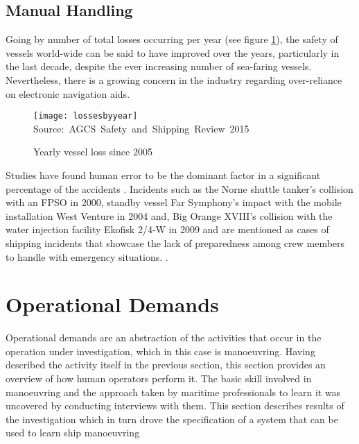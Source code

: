 
\subsection{Manual Handling}
Going by number of total losses occurring per year (see figure \ref{fig:lossesbyyear}), the safety of vessels world-wide can be said to have improved over the years, particularly in the last decade, despite the ever increasing number of sea-faring vessels. Nevertheless, there is a growing concern in the industry regarding over-reliance on electronic navigation aids. 

\begin{figure}
	\centering
	\caption{Yearly vessel loss since 2005}
	\texttt{[image: lossesbyyear]}
	\hbox{Source: AGCS Safety and Shipping Review 2015}
	\label{fig:lossesbyyear}
\end{figure}

Studies have found human error to be the dominant factor in a significant percentage of the accidents \parencite{baker2005accident, hauff2014analysis}. Incidents such as the Norne shuttle tanker's collision with an FPSO in 2000, standby vessel Far Symphony's impact with the mobile installation West Venture in 2004 and, Big Orange XVIII's collision with the water injection facility Ekofisk 2/4-W in 2009 and  are mentioned as cases of shipping incidents that showcase the lack of preparedness among crew members to handle with emergency situations. \parencite{vinnem2013offshore}.

\section{Operational Demands}
\label{sec:operationaldemands}

Operational demands are an abstraction of the activities that occur in the operation under investigation, which in this case is manoeuvring. Having described the activity itself in the previous section, this section provides an overview of how human operators perform it. The basic skill involved in manoeuvring and the approach taken by maritime professionals to learn it was uncovered by conducting interviews with them. This section describes results of the investigation which in turn drove the specification of a system that can be used to learn ship manoeuvring

